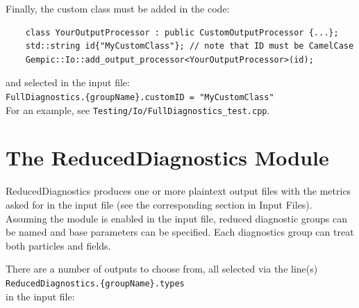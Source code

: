 \documentclass[11pt]{article}
\begin{document}
Finally, the custom class must be added in the code:
\begin{lstlisting}
    class YourOutputProcessor : public CustomOutputProcessor {...};
    std::string id{"MyCustomClass"}; // note that ID must be CamelCase
    Gempic::Io::add_output_processor<YourOutputProcessor>(id);
\end{lstlisting}
and selected in the input file:
\\\lstinline|FullDiagnostics.{groupName}.customID = "MyCustomClass"|\\
For an example, see \verb|Testing/Io/FullDiagnostics_test.cpp|.

\section{The ReducedDiagnostics Module}
ReducedDiagnostics produces one or more plaintext output files with the metrics asked for in the input file (see the corresponding section in Input Files).
Assuming the module is enabled in the input file, reduced diagnostic groups can be named and base parameters can be specified. Each diagnostics group can treat both particles and fields.

There are a number of outputs to choose from, all selected via the line(s) 
\\\lstinline|ReducedDiagnostics.{groupName}.types|\\
in the input file:
\end{document}
